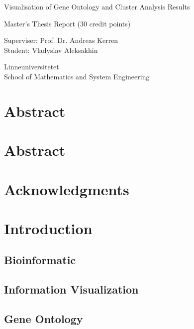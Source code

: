 \documentclass[a4paper,oneside]{article}
\begin{document}
\begin{titlepage}
\begin{center}

\Huge{Visualisation of Gene Ontology and Cluster Analysis Results}

\vfill

\begin{Large}
Master's Thesis Report (30 credit points)

\vfill

Superviser: Prof. Dr. Andreas Kerren\\
Student: Vladyslav Aleksakhin

\vfill

Linneuniversitetet\\
School of Mathematics and System Engineering

\end{Large}


\end{center}
\end{titlepage}

\tableofcontents
\newpage

\section{Abstract}

\newpage

\section{Abstract}

\section{Acknowledgments}

\section{Introduction}

\subsection{Bioinformatic}

\subsection{Information Visualization}

\subsection{Gene Ontology}
\end{document}
